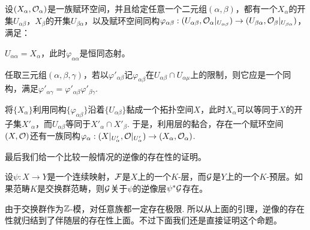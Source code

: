 \begin{pro}[赋环空间的黏合]\label{rsn}
设$(X_\alpha,\mathcal{O}_\alpha)$是一族赋环空间，并且给定任意一个二元组$(\alpha,\beta)$，都有一个$X_\alpha$的开集$U_{\alpha\beta}$，$X_\beta$的开集$U_{\beta\alpha}$，以及赋环空间同构$\varphi_{\alpha\beta}:(U_{\alpha\beta},\mathcal{O}_\alpha|_{U_{\alpha\beta}})\to (U_{\beta\alpha},\mathcal{O}_\beta|_{U_{\beta\alpha}})$，满足：
\begin{compactenum}[~~~1.]
\item $U_{\alpha\alpha}=X_\alpha$，此时$\varphi_{\alpha\alpha}$是恒同态射。
\item 任取三元组$(\alpha,\beta,\gamma)$，若以$\varphi'_{\alpha\beta}$记$\varphi_{\alpha\beta}$在$U_{\alpha\beta}\cap U_{\alpha\mu}$上的限制，则它应是一个同构，满足$\varphi'_{\alpha\gamma}=\varphi'_{\alpha\beta}\varphi'_{\beta\gamma}$.
\end{compactenum}

将$\{X_\alpha\}$利用同构$\{\varphi_{\alpha\beta}\}$沿着$\{U_{\alpha\beta}\}$黏成一个拓扑空间$X$，此时$X_\alpha$可以等同于$X$的开子集$X'_\alpha$，而$U_{\alpha\beta}$等同于$X'_\alpha\cap X'_\beta$. 于是，利用层的黏合，存在一个赋环空间$(X,\mathcal{O})$还有一族同构$\varphi_\alpha:(X|_{U'_\alpha},\mathcal{O}|_{U'_\alpha})\to (X_\alpha,\mathcal{O}_\alpha)$.
\end{pro}

最后我们给一个比较一般情况的逆像的存在性的证明。

\begin{thm}\label{proinverse}
设$\psi:X\to Y$是一个连续映射，$\mathcal{F}$是$X$上的一个$K$-层，而$\mathcal{G}$是$Y$上的一个$K$-预层。如果范畴$K$是交换群范畴，则$\mathcal{G}$关于$\psi$的逆像层$\psi^*\mathcal{G}$存在。
\end{thm}

由于交换群作为$\mathbb{Z}$-模，对任意族都一定存在极限. 所以从上面的引理，逆像的存在性就归结到了伴随层的存在性上面。不过下面我们还是直接证明这个命题。

